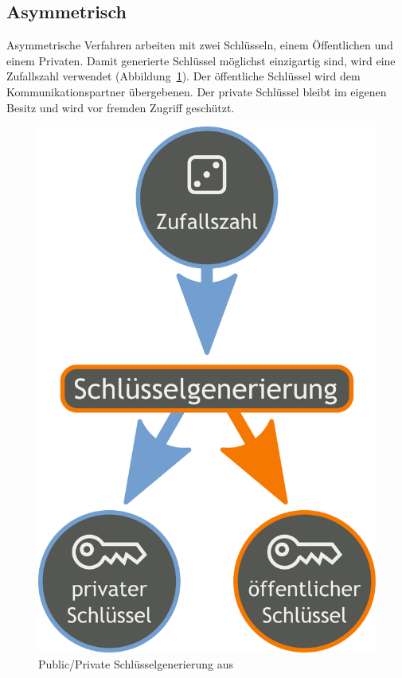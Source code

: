 \documentclass[11pt,a4paper]{report}
\begin{document}
\subsection{Asymmetrisch} \label{sec:auth_asym}

Asymmetrische Verfahren arbeiten mit zwei Schlüsseln, einem Öffentlichen und einem Privaten. Damit generierte Schlüssel möglichst einzigartig sind, wird eine Zufallszahl verwendet (Abbildung~\ref{fig:pp_keygen}). Der öffentliche Schlüssel wird dem Kommunikationspartner übergebenen. Der private Schlüssel bleibt im eigenen Besitz und wird vor fremden Zugriff geschützt. 

\begin{figure}[htbp]
\centering
\includegraphics[scale=0.2]{images/public_private_keygeneration.pdf}
\caption{Public/Private Schlüsselgenerierung aus \cite{wiki_asym_crypto}}
\label{fig:pp_keygen}
\end{figure}
\end{document}
